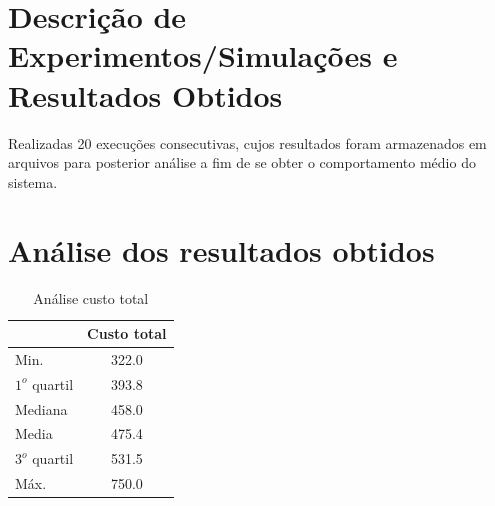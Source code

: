 \documentclass[12pt]{article}
\begin{document}
%	 
%	 
\section{Descrição de Experimentos/Simulações e Resultados Obtidos} \label{sec:DescExp}
Realizadas 20 execuções consecutivas, cujos resultados foram armazenados em arquivos para posterior análise a fim de se obter o comportamento médio do sistema.

\section{Análise dos resultados obtidos} \label{sec:Results}
\begin{table}[h]
	\centering
	\begin{tabular}{|l|c|}
	\hline
	& Custo total \\ \hline
	Min. & 322.0 \\ \hline
	$1^{o}$ quartil & 393.8 \\ \hline
	Mediana & 458.0 \\ \hline
	Media & 475.4 \\ \hline
	$3^{o}$ quartil & 531.5 \\ \hline
	Máx. & 750.0 \\ \hline
	\end{tabular}
	\caption{Análise custo total}
	\label{tabela:custo}
\end{table}
\end{document}
